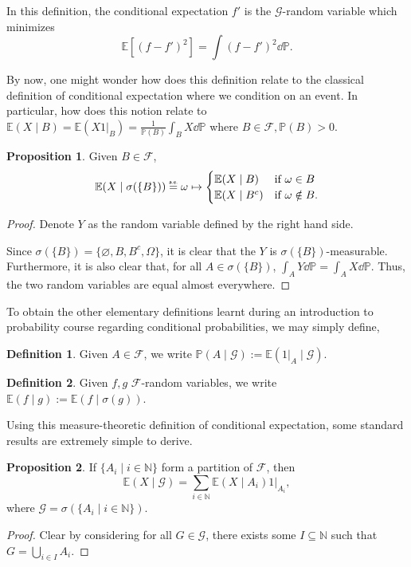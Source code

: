 \documentclass[]{article}
\theoremstyle{definition}
\newtheorem{definition*}{Definition}
\newtheorem{prop}{Proposition}
\theoremstyle{definition}
\newcommand\eqae{\mathrel{\overset{\makebox[0pt]{\mbox{\normalfont\tiny\sffamily a.e.}}}{=}}}
\begin{document}
In this definition, the conditional expectation \(f'\) is the \(\mathcal{G}\)-random variable 
which minimizes 
\[\mathbb{E}[(f - f')^2] = \int (f - f')^2 \dd \mathbb{P}.\]

By now, one might wonder how does this definition relate to the classical definition 
of conditional expectation where we condition on an event. In particular, how 
does this notion relate to \(\mathbb{E}(X \mid B) = \mathbb{E}(X1|_B) = 
\frac{1}{\mathbb{P}(B)}\int_B X \dd \mathbb{P}\) where \(B \in \mathcal{F}, \mathbb{P}(B) > 0\).

\begin{prop}
  Given \(B \in \mathcal{F}\), 
  \[\mathbb{E}(X \mid \sigma(\{B\})) \eqae \omega \mapsto 
    \begin{cases}
      \mathbb{E}(X \mid B) & \text{if } \omega \in B \\
      \mathbb{E}(X \mid B^c) & \text{if } \omega \notin B.
    \end{cases}\]
\end{prop}
\begin{proof}
  Denote \(Y\) as the random variable defined by the right hand side.

  Since \(\sigma(\{B\}) = \{\varnothing, B, B^c, \Omega\}\), it is clear that the 
  \(Y\) is \(\sigma(\{B\})\)-measurable. Furthermore, it is also clear that, for all 
  \(A \in \sigma(\{B\})\), \(\int_A Y \dd \mathbb{P} = \int_A X \dd \mathbb{P}\). 
  Thus, the two random variables are equal almost everywhere.
\end{proof}

To obtain the other elementary definitions learnt during an introduction to probability 
course regarding conditional probabilities, we may simply define, 
\begin{definition*}\label{eq:cond_prop}
  Given \(A \in \mathcal{F}\), we write
  \(\mathbb{P}(A \mid \mathcal{G}) := \mathbb{E}(1|_A \mid \mathcal{G})\).
\end{definition*}
\begin{definition*}\label{eq:cond_expect_rv}
  Given \(f, g\) \(\mathcal{F}\)-random variables, we write 
  \(\mathbb{E}(f \mid g) := \mathbb{E}(f \mid \sigma(g))\).
\end{definition*}

Using this measure-theoretic definition of conditional expectation, some standard 
results are extremely simple to derive. 

\begin{prop}
  If \(\{A_i \mid i \in \mathbb{N}\}\) form a partition of \(\mathcal{F}\), then 
  \[\mathbb{E}(X \mid \mathcal{G}) = \sum_{i \in\mathbb{N}} \mathbb{E}(X \mid A_i) 1|_{A_i},\]
  where \(\mathcal{G} = \sigma(\{A_i \mid i \in \mathbb{N}\})\).
\end{prop}
\begin{proof}
  Clear by considering for all \(G \in \mathcal{G}\), there exists some 
  \(I \subseteq \mathbb{N}\) such that \(G = \bigcup_{i \in I} A_i\).
\end{proof}
\end{document}
